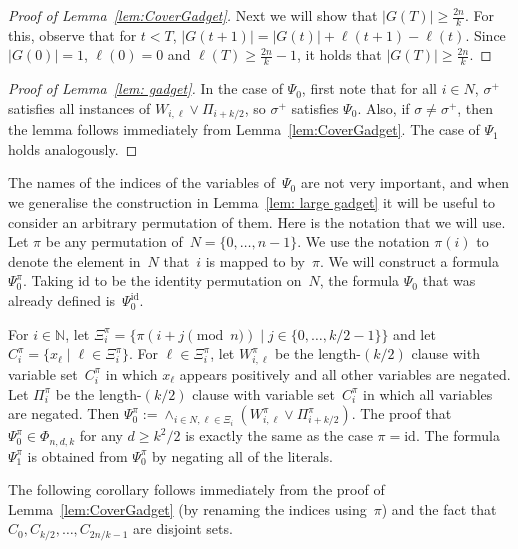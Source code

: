 \documentclass[11pt]{article}
\theoremstyle{definition}
\theoremstyle{remark}
\def\id{\text{id}}
\begin{document}
\begin{proof}[Proof of Lemma~\ref{lem:CoverGadget}]
Next we will show that $|G(T)|\ge \frac{2n}{k}$. For this, observe that for $t<T$, $|G(t+1)|=|G(t)|+\ell(t+1)-\ell(t)$. Since $|G(0)|=1$, $\ell(0)=0$ and $\ell(T)\ge \frac{2n}{k}-1$, it holds that $|G(T)|\ge \frac{2n}{k}$.
\end{proof}


\begin{proof} [Proof of
Lemma~\ref{lem: gadget}] 
In the case of $\Psi_0$, first note that for all $i\in N$, $\sigma^+$ satisfies all instances of $W_{i,\ell} \vee \Pi_{i+k/2}$, so $\sigma^+$ satisfies $\Psi_0$. Also, if $\sigma\neq \sigma^+$,
then the lemma follows immediately from  Lemma~\ref{lem:CoverGadget}.  
The case of $\Psi_1$ holds analogously.
\end{proof}


 
 
 
 
  


   

 
 
  

  

 

The names of the indices of the variables of~$\Psi_0$ are not very important, and when we generalise the construction in Lemma~\ref{lem: large gadget} it will be useful to consider an arbitrary permutation of them.
Here is the notation that we will use.  
Let $\pi$ be any permutation of~$N=\{0,\ldots,n-1\}$. We use the notation $\pi(i)$ to denote the element in~$N$ that~$i$ is mapped to by~$\pi$.
We will construct a formula $\Psi_0^{\pi}$.
Taking $\id$ to be the identity permutation on~$N$, the formula $\Psi_0$ that was already defined is~$\Psi_0^{\id}$.


For $i\in  \mathbb{N}$, let
$\Xi_i^{\pi} = \{ \pi(i+j \pmod n) \mid j \in \{0,\ldots, k/2-1\} \}$ 
and let $C_i^{\pi} = \{x_\ell \mid \ell \in \Xi_i^{\pi}\}$.
For $\ell \in \Xi^{\pi}_i$, let $W_{i,\ell}^{\pi}$ be the length-$(k/2)$ clause with variable set~$C_i^{\pi}$ in which $x_\ell$ appears positively and all other variables are negated. 
Let $\Pi_i^{\pi}$ be the length-$(k/2)$ clause with variable set~$C_i^{\pi}$ in which all variables are negated. Then
$\Psi_0^\pi := \wedge_{i\in N, \ell \in \Xi_i} (W_{i,\ell}^\pi \vee \Pi^\pi_{i+k/2})$.  
The proof that $\Psi_0^{\pi}  \in \Phi_{n,d,k}$ for any $d\geq k^2/2$ is exactly the same as the case $\pi=\id$.
The formula $\Psi_1^\pi$ is obtained from $\Psi_0^\pi$ by negating all of the literals.
 
The following corollary follows immediately from the proof of Lemma~\ref{lem:CoverGadget} (by renaming the indices using~$\pi$)
and the fact that $C_{0}, C_{k/2}, \dots, C_{2n/k-1}$ are disjoint sets.
\end{document}
